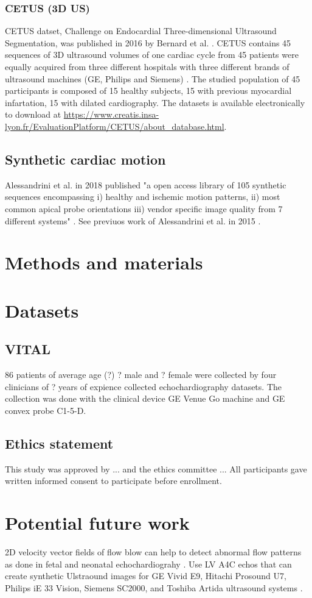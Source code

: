\subsubsection{CETUS (3D US)}
CETUS datset, Challenge on Endocardial Three-dimensional Ultrasound Segmentation, was published in 2016 by Bernard et al. \cite{bernard2016TMI}.
CETUS contains 45 sequences of 3D ultrasound volumes of one cardiac cycle from 45 patients were equally acquired from three different hospitals with three different brands of ultrasound machines (GE, Philips and Siemens) \cite{bernard2016TMI}.
The studied population of 45 participants is composed of 15 healthy subjects, 15 with previous myocardial infartation, 15 with dilated cardiography.
The datasets is available electronically to download at \url{https://www.creatis.insa-lyon.fr/EvaluationPlatform/CETUS/about_database.html}.

\subsection{Synthetic cardiac motion}
Alessandrini et al. in 2018 published "a open access library of 105 synthetic sequences encompassing i) healthy and ischemic motion patterns, ii) most common apical probe orientations iii) vendor specific image quality from 7 different systems" \cite{alessandrini2018}.
See previuos work of Alessandrini et al. in 2015  \cite{alessandrini2015_isbi}.


\section{Methods and materials}

\section{Datasets}

\subsection{VITAL}
86 patients of average age (?) ? male and ? female were collected by four clinicians of ? years of expience collected echochardiography datasets.
The collection was done with the clinical device GE Venue Go machine and GE convex probe C1-5-D.

\subsection{Ethics statement}
This study was approved by ... and the ethics committee ...
All participants gave written informed consent to participate before enrollment.

\section{Potential future work}
2D velocity vector fields of flow blow can help to detect abnormal flow patterns as done in fetal and neonatal echochardiograhy \cite{Meyers2020}.
Use LV A4C echos that can create synthetic Ulstraound images for GE Vivid E9, Hitachi Prosound U7, Philips iE 33 Vision, Siemens SC2000, and Toshiba Artida ultrasound systems \cite{brindise2020unsupervised}. 
